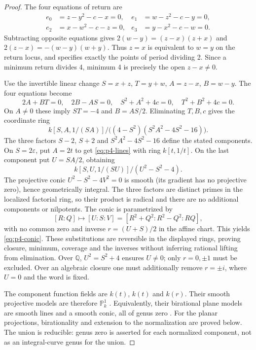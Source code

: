 \documentclass{jT}
\newcommand{\Q}{\mathbb Q}
\newcommand{\PP}{\mathbb P}
\begin{document}
\begin{proof}
The four equations of return are
\[
\begin{aligned}
e_0&=z-y^2-c-x=0,& e_1&=w-z^2-c-y=0,\\
e_2&=x-w^2-c-z=0,& e_3&=y-x^2-c-w=0.
\end{aligned}
\]
Subtracting opposite equations gives $2(w-y)=(z-x)(z+x)$ and $2(z-x)=-(w-y)(w+y)$. Thus $z=x$ is equivalent to $w=y$ on the return locus, and specifies exactly the points of period dividing 2. Since a minimum return divides 4, minimum 4 is precisely the open $z-x\ne0$.

Use the invertible linear change $S=x+z$, $T=y+w$, $A=z-x$, $B=w-y$. The four equations become
\[
2A+BT=0,\quad 2B-AS=0,\quad S^2+A^2+4c=0,\quad T^2+B^2+4c=0.
\]
On $A\ne0$ these imply $ST=-4$ and $B=AS/2$. Eliminating $T,B,c$ gives the coordinate ring
\begin{equation}\label{eq:p4-ring}
k[S,A,1/(SA)]\big/\big((4-S^2)(S^2A^2-4S^2-16)\big).
\end{equation}
The three factors $S-2$, $S+2$ and $S^2A^2-4S^2-16$ define the stated components. On $S=2\varepsilon$, put $A=2t$ to get \eqref{eq:p4-lines} with ring $k[t,1/t]$. On the last component put $U=SA/2$, obtaining
\[
k[S,U,1/(SU)]/(U^2-S^2-4).
\]
The projective conic $U^2-S^2-4V^2=0$ is smooth (its gradient has no projective zero), hence geometrically integral. The three factors are distinct primes in the localized factorial ring, so their product is radical and there are no additional components or nilpotents. The conic is parametrized by
\[
[R:Q]\longmapsto[U:S:V]=[R^2+Q^2:R^2-Q^2:RQ],
\]
with no common zero and inverse $r=(U+S)/2$ in the affine chart. This yields \eqref{eq:p4-conic}. These substitutions are reversible in the displayed rings, proving closure, minimum, coverage and the inverses without inferring rational lifting from elimination. Over $\Q$, $U^2=S^2+4$ ensures $U\ne0$; only $r=0,\pm1$ must be excluded. Over an algebraic closure one must additionally remove $r=\pm i$, where $U=0$ and the word is fixed.

The component function fields are $k(t)$, $k(t)$ and $k(r)$. Their smooth projective models are therefore $\PP^1_k$ \cite[Theorem 2.6, tag 0BY1]{stacks}. Equivalently, their birational plane models are smooth lines and a smooth conic, all of genus zero \cite[Lemma 9.3, tag 0BYD]{stacks}. For the planar projections, birationality and extension to the normalization are proved below. The union is reducible: genus zero is asserted for each normalized component, not as an integral-curve genus for the union.
\end{proof}
\end{document}
